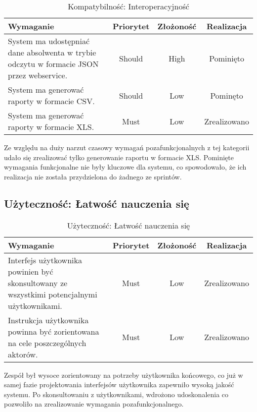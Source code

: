 \begin{table}[H]
\centering
\begin{tabular}{ | p{8cm} | c | c | c | }
\hline
\textbf{Wymaganie} & \textbf{Priorytet} & \textbf{Złożoność} & \textbf{Realizacja} \\ \hline
System ma udostępniać dane absolwenta w
trybie odczytu w formacie JSON przez webservice.
 & Should & High & Pominięto \\ \hline
System ma generować raporty w formacie
CSV.
 & Should & Low & Pominęto \\ \hline
System ma generować raporty w formacie
XLS.
 & Must & Low & Zrealizowano \\ \hline
\end{tabular}
\caption{Kompatybilność: Interoperacyjność}\label{tab:reqs}
\end{table}

Ze względu na duży narzut czasowy wymagań pozafunkcjonalnych z tej kategorii udało się zrealizować tylko generowanie raportu w formacie XLS. Pominięte wymagania funkcjonalne nie były kluczowe dla systemu, co spowodowało, że ich realizacja nie została przydzielona do żadnego ze sprintów.

\subsection{Użyteczność: Łatwość nauczenia się}

\begin{table}[H]
\centering
\begin{tabular}{ | p{8cm} | c | c | c | }
\hline
\textbf{Wymaganie} & \textbf{Priorytet} & \textbf{Złożoność} & \textbf{Realizacja} \\ \hline
Interfejs użytkownika powinien być skonsultowany ze wszystkimi potencjalnymi użytkownikami.
 & Must & Low & Zrealizowano \\ \hline
Instrukcja użytkownika powinna być zorientowana na cele poszczególnych aktorów.
 & Must & Low & Zrealizowano \\ \hline
\end{tabular}
\caption{Użyteczność: Łatwość nauczenia się}\label{tab:reqs}
\end{table}

Zespół był wysoce zorientowany na potrzeby użytkownika końcowego, co już w samej fazie projektowania interfejsów użytkownika zapewniło wysoką jakość systemu. Po skonsultowaniu z użytkownikami, wdrożono udoskonalenia co pozwoliło na zrealizowanie wymagania pozafunkcjonalnego.

